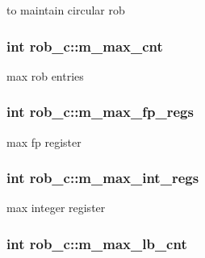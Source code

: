 \label{classrob__c_a7420d155265448b2d0fcbbcae5293c05}
to maintain circular rob \hypertarget{classrob__c_ab233034fffb30c0bbffc402e74cbd3b3}{
\subsubsection[{m\_\-max\_\-cnt}]{\setlength{\rightskip}{0pt plus 5cm}int {\bf rob\_\-c::m\_\-max\_\-cnt}}}
\label{classrob__c_ab233034fffb30c0bbffc402e74cbd3b3}
max rob entries \hypertarget{classrob__c_a99349607046f231290135c44f6e466af}{
\subsubsection[{m\_\-max\_\-fp\_\-regs}]{\setlength{\rightskip}{0pt plus 5cm}int {\bf rob\_\-c::m\_\-max\_\-fp\_\-regs}}}
\label{classrob__c_a99349607046f231290135c44f6e466af}
max fp register \hypertarget{classrob__c_ae9c171e9959ffc16154f278555ba72df}{
\subsubsection[{m\_\-max\_\-int\_\-regs}]{\setlength{\rightskip}{0pt plus 5cm}int {\bf rob\_\-c::m\_\-max\_\-int\_\-regs}}}
\label{classrob__c_ae9c171e9959ffc16154f278555ba72df}
max integer register \hypertarget{classrob__c_aed06018aced1ac1285e9b6e07a7ec25e}{
\subsubsection[{m\_\-max\_\-lb\_\-cnt}]{\setlength{\rightskip}{0pt plus 5cm}int {\bf rob\_\-c::m\_\-max\_\-lb\_\-cnt}}}
\label{classrob__c_aed06018aced1ac1285e9b6e07a7ec25e}
